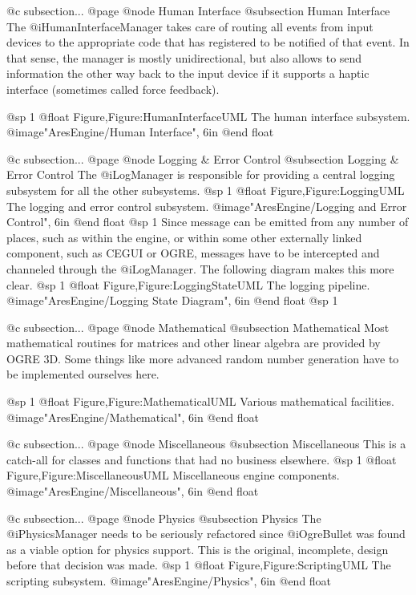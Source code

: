@c subsection...
@page 
@node Human Interface
@subsection Human Interface
The @i{HumanInterfaceManager} takes care of routing all events from input devices to the appropriate code that has registered to be notified of that event. In that sense, the manager is mostly unidirectional, but also allows to send information the other way back to the input device if it supports a haptic interface (sometimes called force feedback).

@sp 1
@float Figure,Figure:HumanInterfaceUML
The human interface subsystem.
@image{"AresEngine/Human Interface", 6in}
@end float

@c subsection...
@page 
@node Logging & Error Control
@subsection Logging & Error Control
The @i{LogManager} is responsible for providing a central logging subsystem for all the other subsystems.
@sp 1
@float Figure,Figure:LoggingUML
The logging and error control subsystem.
@image{"AresEngine/Logging and Error Control", 6in}
@end float
@sp 1
Since message can be emitted from any number of places, such as within the engine, or within some other externally linked component, such as CEGUI or OGRE, messages have to be intercepted and channeled through the @i{LogManager}. The following diagram makes this more clear.
@sp 1
@float Figure,Figure:LoggingStateUML
The logging pipeline.
@image{"AresEngine/Logging State Diagram", 6in}
@end float
@sp 1

@c subsection...
@page 
@node Mathematical
@subsection Mathematical
Most mathematical routines for matrices and other linear algebra are provided by OGRE 3D. Some things like more advanced random number generation have to be implemented ourselves here.

@sp 1
@float Figure,Figure:MathematicalUML
Various mathematical facilities.
@image{"AresEngine/Mathematical", 6in}
@end float

@c subsection...
@page 
@node Miscellaneous
@subsection Miscellaneous
This is a catch-all for classes and functions that had no business elsewhere.
@sp 1
@float Figure,Figure:MiscellaneousUML
Miscellaneous engine components.
@image{"AresEngine/Miscellaneous", 6in}
@end float

@c subsection...
@page 
@node Physics
@subsection Physics
The @i{PhysicsManager} needs to be seriously refactored since @i{OgreBullet} was found as a viable option for physics support. This is the original, incomplete, design before that decision was made.
@sp 1
@float Figure,Figure:ScriptingUML
The scripting subsystem.
@image{"AresEngine/Physics", 6in}
@end float

